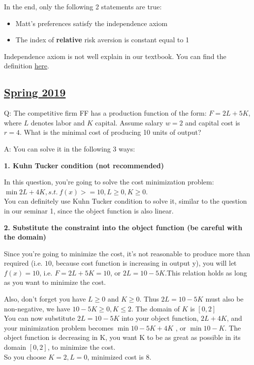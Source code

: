 \documentclass{article}
\begin{document}
\medskip

In the end, only the following 2 statements are true:

\begin{itemize}
\item Matt's preferences satisfy the independence axiom
\item The index of \textbf{relative} risk aversion is constant equal
to 1
\end{itemize}

Independence axiom is not well explain in our textbook. You can find the definition \href{https://www.uio.no/studier/emner/sv/oekonomi/ECON4260/h17/dokumenter/exputil.pdf}{here}.


\subsection{\href{https://www.uio.no/studier/emner/sv/oekonomi/ECON3200/previous-exams/econ32_4200-2019v-sensorveiledning.pdf}{Spring 2019}}

Q: The competitive firm FF has a production function of the form:
$F = 2L + 5K$, where $L$ denotes labor and $K$ capital. Assume salary $w=2$ and capital cost is $r=4$. What is the minimal cost of producing 10 units of output?


\bigskip
A: You can solve it in the following 3 ways:

\medskip

\textbf{1. Kuhn Tucker condition (not recommended)}

In this question, you're going to solve the cost minimization problem: $\min 2L + 4K , s.t. \  f(x) > = 10, L\ge0, K\ge0$. \\
You can definitely use Kuhn Tucker condition to solve it, similar to the question in our seminar 1, since the object function is also linear. 

\bigskip

\textbf{2. Substitute the constraint into the object function (be careful with the domain)}

Since you're going to minimize the cost, it's not reasonable to produce more than required (i.e. $10$, because cost function is increasing in output y), you will let $f(x)=10$, i.e. $F= 2L+5K=10$, or $2L=10-5K$.​ This relation holds as long as you want to minimize the cost. 
\medskip

Also, don't forget you have  $L\ge0$ and $K\ge0$.  Thus $2L=10-5K$ must also be non-negative, we have $10-5K \ge0, K\le2$. The domain of $K$ is $[0,2]$ \\
You can now substitute $2L=10-5K$ into your object function, $2L+4K$, and your minimization problem​ becomes $\min 10-5K +4K$ , or $\min 10 - K$. The object function is decreasing in K,  you want K to be as great as possible in its domain $[0,2]$, to minimize the cost. \\
So you choose $K=2, L=0$, minimized cost is $8$.
\medskip
\end{document}
